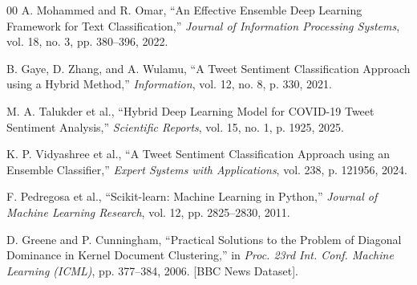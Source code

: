 \documentclass[conference]{IEEEtran}
\begin{document}
\begin{thebibliography}{00}
A. Mohammed and R. Omar, ``An Effective Ensemble Deep Learning Framework for Text Classification,'' \textit{Journal of Information Processing Systems}, vol. 18, no. 3, pp. 380--396, 2022.

B. Gaye, D. Zhang, and A. Wulamu, ``A Tweet Sentiment Classification Approach using a Hybrid Method,'' \textit{Information}, vol. 12, no. 8, p. 330, 2021.

M. A. Talukder et al., ``Hybrid Deep Learning Model for COVID-19 Tweet Sentiment Analysis,'' \textit{Scientific Reports}, vol. 15, no. 1, p. 1925, 2025.

K. P. Vidyashree et al., ``A Tweet Sentiment Classification Approach using an Ensemble Classifier,'' \textit{Expert Systems with Applications}, vol. 238, p. 121956, 2024.

F. Pedregosa et al., ``Scikit-learn: Machine Learning in Python,'' \textit{Journal of Machine Learning Research}, vol. 12, pp. 2825--2830, 2011.

D. Greene and P. Cunningham, ``Practical Solutions to the Problem of Diagonal Dominance in Kernel Document Clustering,'' in \textit{Proc. 23rd Int. Conf. Machine Learning (ICML)}, pp. 377--384, 2006. [BBC News Dataset].

\end{thebibliography}
\end{document}
